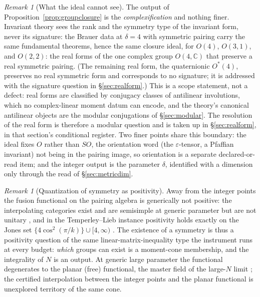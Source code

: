 \documentclass[11pt]{article}
\theoremstyle{definition}
\theoremstyle{remark}
\newtheorem{remark}[theorem]{Remark}
\begin{document}
\begin{remark}[What the ideal cannot see]\label{rem:complexpoint}
The output of Proposition~\ref{prop:groupclosure} is the
\emph{complexification} and nothing finer.  Invariant theory sees the
rank and the symmetry type of the invariant form, never its signature:
the Brauer data at $\delta = 4$ with symmetric pairing carry the same
fundamental theorems, hence the same closure ideal, for $O(4)$,
$O(3,1)$, and $O(2,2)$: the real forms of the one complex group
$O(4,\mathbb C)$ that preserve a real symmetric pairing.  (The
remaining real form, the quaternionic $O^*(4)$, preserves no real
symmetric form and corresponds to no signature; it is addressed with
the signature question in \S\ref{sec:realform}.)  This is a scope statement, not a defect: real forms
are classified by conjugacy classes of antilinear involutions, which no
complex-linear moment datum can encode, and the theory's canonical
antilinear objects are the modular conjugations of \S\ref{sec:modular}.
The resolution of the real form is therefore a modular question and is
taken up in \S\ref{sec:realform}, in that section's conditional
register.  Two finer points share this boundary: the ideal fixes $O$
rather than $SO$, the orientation word (the $\varepsilon$-tensor, a
Pfaffian invariant) not being in the pairing image, so orientation is a
separate declared-or-read item; and the integer output is the parameter
$\delta$, identified with a dimension only through the read of
\S\ref{sec:metricdim}.
\end{remark}

\begin{remark}[Quantization of symmetry as positivity]\label{rem:jones}
Away from the integer points the fusion functional on the pairing
algebra is generically not positive: the interpolating categories exist
and are semisimple at generic parameter but are not unitary
\cite{deligne}, and in the Temperley--Lieb instance positivity holds
exactly on the Jones set $\{4\cos^2(\pi/k)\} \cup [4, \infty)$
\cite{jones}.  The existence of a symmetry is thus a positivity
question of the same linear-matrix-inequality type the instrument runs
at every budget: \emph{which} groups can exist is a moment-cone
membership, and the integrality of $N$ is an output.  At generic large
parameter the functional degenerates to the planar (free) functional,
the master field of the large-$N$ limit \cite{voiculescu}; the
certified interpolation between the integer points and the planar
functional is unexplored territory of the same cone.
\end{remark}
\end{document}
